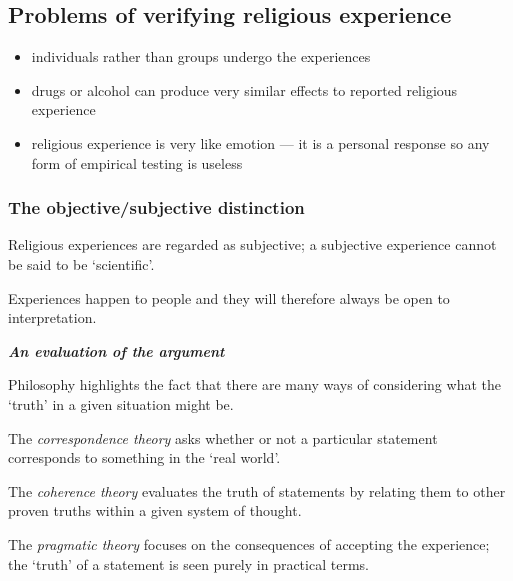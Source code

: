 \documentclass{article}
\begin{document}
\subsection*{Problems of verifying religious experience}

\begin{itemize}
\item individuals rather than groups undergo the experiences

\item drugs or alcohol can produce very similar effects to reported religious experience

\item religious experience is very like emotion --- it is a personal response so any form of empirical testing is useless
\end{itemize}

\subsubsection*{The objective\slash subjective distinction}

Religious experiences are regarded as subjective; a subjective experience cannot be said to be `scientific'.

Experiences happen to people and they will therefore always be open to interpretation.

\textbf{\textit{An evaluation of the argument}}

Philosophy highlights the fact that there are many ways of considering what the `truth' in a given situation might be.

The \textsl{correspondence theory} asks whether or not a particular statement corresponds to something in the `real world'.

The \textsl{coherence theory} evaluates the truth of statements by relating them to other proven truths within a given system of thought.

The \textsl{pragmatic theory} focuses on the consequences of accepting the experience; the `truth' of a statement is seen purely in practical terms.
\end{document}
